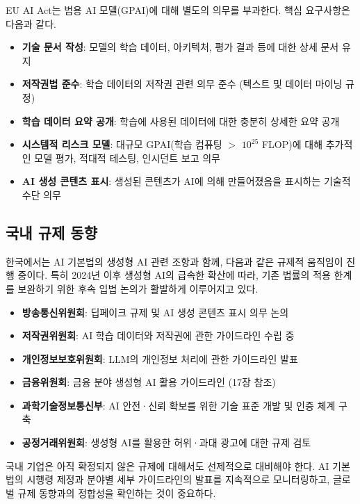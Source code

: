 EU AI Act는 범용 AI 모델(GPAI)에 대해 별도의 의무를 부과한다. 핵심 요구사항은 다음과 같다.

\begin{itemize}
 \item \textbf{기술 문서 작성}: 모델의 학습 데이터, 아키텍처, 평가 결과 등에 대한 상세 문서 유지
 \item \textbf{저작권법 준수}: 학습 데이터의 저작권 관련 의무 준수 (텍스트 및 데이터 마이닝 규정)
 \item \textbf{학습 데이터 요약 공개}: 학습에 사용된 데이터에 대한 충분히 상세한 요약 공개
 \item \textbf{시스템적 리스크 모델}: 대규모 GPAI(학습 컴퓨팅 $>$ $10^{25}$ FLOP)에 대해 추가적인 모델 평가, 적대적 테스팅, 인시던트 보고 의무
 \item \textbf{AI 생성 콘텐츠 표시}: 생성된 콘텐츠가 AI에 의해 만들어졌음을 표시하는 기술적 수단 의무
\end{itemize}

\subsection{국내 규제 동향}
\label{sec:gen.4.2}

한국에서는 AI 기본법의 생성형 AI 관련 조항과 함께, 다음과 같은 규제적 움직임이 진행 중이다. 특히 2024년 이후 생성형 AI의 급속한 확산에 따라, 기존 법률의 적용 한계를 보완하기 위한 후속 입법 논의가 활발하게 이루어지고 있다.

\begin{itemize}
 \item \textbf{방송통신위원회}: 딥페이크 규제 및 AI 생성 콘텐츠 표시 의무 논의
 \item \textbf{저작권위원회}: AI 학습 데이터와 저작권에 관한 가이드라인 수립 중
 \item \textbf{개인정보보호위원회}: LLM의 개인정보 처리에 관한 가이드라인 발표
 \item \textbf{금융위원회}: 금융 분야 생성형 AI 활용 가이드라인 (17장 참조)
 \item \textbf{과학기술정보통신부}: AI 안전·신뢰 확보를 위한 기술 표준 개발 및 인증 체계 구축
 \item \textbf{공정거래위원회}: 생성형 AI를 활용한 허위·과대 광고에 대한 규제 검토
\end{itemize}

국내 기업은 아직 확정되지 않은 규제에 대해서도 선제적으로 대비해야 한다. AI 기본법의 시행령 제정과 분야별 세부 가이드라인의 발표를 지속적으로 모니터링하고, 글로벌 규제 동향과의 정합성을 확인하는 것이 중요하다.

